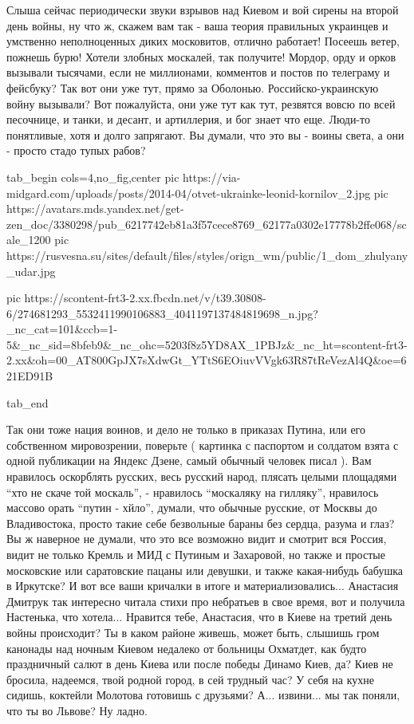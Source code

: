 Слыша сейчас
периодически звуки взрывов над Киевом и вой сирены на второй день войны, ну что
ж, скажем вам так - ваша теория правильных украинцев и умственно неполноценных
диких московитов, отлично работает!  Посеешь ветер, пожнешь бурю!  Хотели
злобных москалей, так получите! Мордор, орду и орков вызывали тысячами, если не
миллионами, комментов и постов по телеграму и фейсбуку? Так вот они уже тут,
прямо за Оболонью.
Российско-украинскую войну вызывали? Вот пожалуйста, они уже тут как тут,
резвятся вовсю по всей песочнице, и танки, и десант, и артиллерия, и бог знает
что еще. Люди-то понятливые, хотя и долго запрягают. Вы думали, что это вы -
воины света, а они - просто стадо тупых рабов? 

\ifcmt
  tab_begin cols=4,no_fig,center
     pic https://via-midgard.com/uploads/posts/2014-04/otvet-ukrainke-leonid-kornilov_2.jpg
     pic https://avatars.mds.yandex.net/get-zen_doc/3380298/pub_6217742eb81a3f57cece8769_62177a0302e17778b2ffe068/scale_1200
     pic https://rusvesna.su/sites/default/files/styles/orign_wm/public/1_dom_zhulyany_udar.jpg

     pic https://scontent-frt3-2.xx.fbcdn.net/v/t39.30808-6/274681293_5532411990106883_4041197137484819698_n.jpg?_nc_cat=101&ccb=1-5&_nc_sid=8bfeb9&_nc_ohc=5203f8z5YD8AX_1PBJz&_nc_ht=scontent-frt3-2.xx&oh=00_AT800GpJX7sXdwGt_YTtS6EOiuvVVgk63R87tReVezAl4Q&oe=621ED91B

  tab_end
\fi

Так они тоже нация воинов, и дело не только в приказах Путина, или его
собственном мировозрении, поверьте ( картинка с паспортом и солдатом взята с
одной публикации на Яндекс Дзене, самый обычный человек писал ). Вам нравилось
оскорблять русских, весь русский народ, плясать целыми площадями \enquote{хто
не скаче той москаль}, - нравилось \enquote{москаляку на гилляку}, нравилось
массово орать \enquote{путин - хйло}, думали, что обычные русские, от Москвы до
Владивостока, просто такие себе безвольные бараны без сердца, разума и глаз? Вы
ж наверное не думали, что это все возможно видит и смотрит вся Россия, видит не
только Кремль и МИД с Путиным и Захаровой, но также и простые московские или
саратовские пацаны или девушки, и также какая-нибудь бабушка в Иркутске? И вот
все ваши кричалки в итоге и материализовались... Анастасия Дмитрук так
интересно читала стихи про небратьев в свое время, вот и получила Настенька,
что хотела... Нравится тебе, Анастасия, что в Киеве на третий день войны
происходит? Ты в каком районе живешь, может быть, слышишь гром канонады над
ночным Киевом недалеко от больницы Охматдет, как будто праздничный салют в день
Киева или после победы Динамо Киев, да? Киев не бросила, надеемся, твой родной
город, в сей трудный час? У себя на кухне сидишь, коктейли Молотова готовишь с
друзьями? А... извини... мы так поняли, что ты во Львове? Ну ладно.

